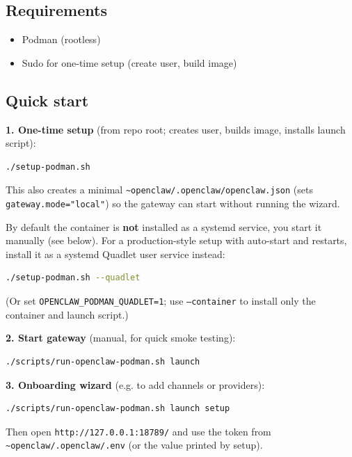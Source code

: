 \subsection{Requirements}


\begin{itemize}
  \item Podman (rootless)
  \item Sudo for one-time setup (create user, build image)
\end{itemize}


\subsection{Quick start}


\textbf{1. One-time setup} (from repo root; creates user, builds image, installs launch script):

\begin{lstlisting}[language=bash]
./setup-podman.sh
\end{lstlisting}


This also creates a minimal \texttt{\textasciitilde{}openclaw/.openclaw/openclaw.json} (sets \texttt{gateway.mode="local"}) so the gateway can start without running the wizard.

By default the container is \textbf{not} installed as a systemd service, you start it manually (see below). For a production-style setup with auto-start and restarts, install it as a systemd Quadlet user service instead:

\begin{lstlisting}[language=bash]
./setup-podman.sh --quadlet
\end{lstlisting}


(Or set \texttt{OPENCLAW\_PODMAN\_QUADLET=1}; use \texttt{--container} to install only the container and launch script.)

\textbf{2. Start gateway} (manual, for quick smoke testing):

\begin{lstlisting}[language=bash]
./scripts/run-openclaw-podman.sh launch
\end{lstlisting}


\textbf{3. Onboarding wizard} (e.g. to add channels or providers):

\begin{lstlisting}[language=bash]
./scripts/run-openclaw-podman.sh launch setup
\end{lstlisting}


Then open \texttt{http://127.0.0.1:18789/} and use the token from \texttt{\textasciitilde{}openclaw/.openclaw/.env} (or the value printed by setup).

